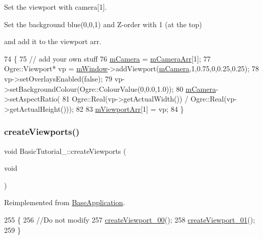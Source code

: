 Set the viewport with camera\mbox{[}1\mbox{]}. 

Set the background blue(0,0,1) and Z-\/order with 1 (at the top)

and add it to the viewport arr. 
\begin{DoxyCode}
74 \{
75     \textcolor{comment}{// add your own stuff}
76     \hyperlink{class_base_application_a3829c6b12afe911e97e6b4524b33a38b}{mCamera} = \hyperlink{class_basic_tutorial__00_af8d457d912286a98c0975c52d4faf910}{mCameraArr}[1];
77     Ogre::Viewport* vp = \hyperlink{class_base_application_ac5d8e9c81e036897bc82f81eff8c570f}{mWindow}->addViewport(\hyperlink{class_base_application_a3829c6b12afe911e97e6b4524b33a38b}{mCamera},1,0.75,0,0.25,0.25);
78     vp->setOverlaysEnabled(\textcolor{keyword}{false});
79     vp->setBackgroundColour(Ogre::ColourValue(0,0.0,1.0));
80     \hyperlink{class_base_application_a3829c6b12afe911e97e6b4524b33a38b}{mCamera}->setAspectRatio(
81         Ogre::Real(vp->getActualWidth()) / Ogre::Real(vp->getActualHeight()));
82 
83     \hyperlink{class_basic_tutorial__00_a6676a92b50e9b43634d4c66488537b73}{mViewportArr}[1] = vp;
84 \}
\end{DoxyCode}
\mbox{\label{class_basic_tutorial__00_adc2454d9f8226e0958ecf702f355846e}} 
\subsubsection{\texorpdfstring{create\+Viewports()}{createViewports()}}
{\footnotesize\ttfamily void Basic\+Tutorial\+\_\+::create\+Viewports (\begin{DoxyParamCaption}\item[{void}]{ }\end{DoxyParamCaption})\hspace{0.3cm}{\ttfamily [virtual]}}



Reimplemented from \hyperlink{class_base_application_a1f8f6730cae6ec769d8730b1af48486e}{Base\+Application}.


\begin{DoxyCode}
255 \{
256     \textcolor{comment}{//Do not modify}
257     \hyperlink{class_basic_tutorial__00_a6d4684502f2f7b2cf628a975d7750d8e}{createViewport\_00}();
258     \hyperlink{class_basic_tutorial__00_a2801a2f0d91d80b471da48344d2ccccf}{createViewport\_01}();
259 \}
\end{DoxyCode}
\mbox{\label{class_basic_tutorial__00_a94e281a96584a25bf57b1c5e73737c81}} 
